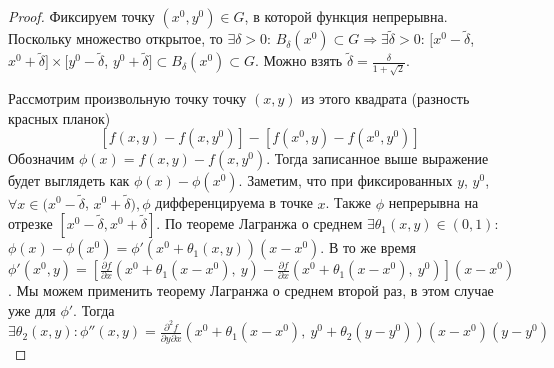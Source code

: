 \begin{proof}
    Фиксируем точку $(x^0, y^0) \in G$, в которой функция непрерывна. Поскольку множество открытое, то $\exists \delta > 0$: $B_\delta(x^0) \subset G \Rightarrow \exists \widetilde{\delta} > 0$: $[x^0 - \widetilde{\delta}$, $x^0 + \widetilde{\delta }] \times [y^0 - \widetilde{\delta}$, $y^0 + \widetilde{\delta}] \subset B_{\delta}(x^0) \subset G$. Можно взять $\widetilde{\delta} = \frac{\delta}{1 + \sqrt{2}}$.
    \begin{center}
    \end{center}

    \noindent Рассмотрим произвольную точку точку $(x, y)$ из этого квадрата (разность красных планок)
    $$\left[f(x, y) - f(x, y^0)\right] - \left[f(x^0, y) - f(x^0, y^0)\right]$$ Обозначим $\phi(x) = f(x, y) - f(x, y^0)$. Тогда записанное выше выражение будет выглядеть как $\phi(x) - \phi(x^0)$. Заметим, что при фиксированных $y$, $y^0$, $\forall x \in (x^0 - \widetilde{\delta}$, $x^0 + \widetilde{\delta}), \phi$ дифференцируема в точке $x$. Также $\phi$ непрерывна на отрезке $[x^0 - \widetilde{\delta}, x^0 + \widetilde{\delta}]$. 
    \noindent По теореме Лагранжа о среднем $\exists \theta_1(x, y) \in (0, 1)$: $\phi(x) - \phi(x^0) = \phi'(x^0 + \theta_1(x, y))(x - x^0)$. В то же время $ \phi'(x^0, y) = \left[\frac{\partial f}{\partial x}(x^0 + \theta_1(x - x^0), \ y) - \frac{\partial f}{\partial x}(x^0 + \theta_1(x - x^0), \ y^0)\right](x - x^0)$. Мы можем применить теорему Лагранжа о среднем второй раз, в этом случае уже для $\phi'$. Тогда $\exists \theta_2(x, y): \phi''(x, y) 
    = \frac{\partial^2 f}{\partial y \partial x}(x^0 + \theta_1(x - x^0), \ y^0 + \theta_2(y - y^0))(x - x^0)(y - y^0)$


\end{proof}
